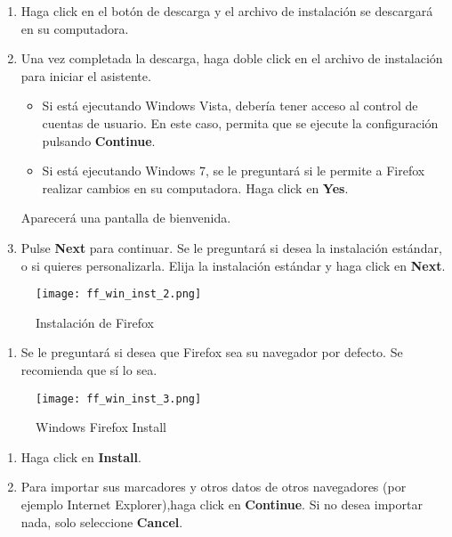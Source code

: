 \documentclass[10pt,a5paper,twoside,,]{book}
\providecommand{\tightlist}{%
  \setlength{\itemsep}{0pt}\setlength{\parskip}{0pt}}
\begin{document}
\begin{enumerate}
\def\labelenumi{\arabic{enumi}.}
\setcounter{enumi}{1}
\item
  Haga click en el botón de descarga y el archivo de instalación se
  descargará en su computadora.
\item
  Una vez completada la descarga, haga doble click en el archivo de
  instalación para iniciar el asistente.

  \begin{itemize}
  \tightlist
  \item
    Si está ejecutando Windows Vista, debería tener acceso al control de
    cuentas de usuario. En este caso, permita que se ejecute la
    configuración pulsando \textbf{Continue}.
  \item
    Si está ejecutando Windows 7, se le preguntará si le permite a
    Firefox realizar cambios en su computadora. Haga click en
    \textbf{Yes}.
  \end{itemize}

  Aparecerá una pantalla de bienvenida.
\item
  Pulse \textbf{Next} para continuar. Se le preguntará si desea la
  instalación estándar, o si quieres personalizarla. Elija la
  instalación estándar y haga click en \textbf{Next}.
\end{enumerate}

\begin{figure}[htbp]
\centering
\texttt{[image: ff\_win\_inst\_2.png]}
\caption{Instalación de Firefox}
\end{figure}

\begin{enumerate}
\def\labelenumi{\arabic{enumi}.}
\setcounter{enumi}{4}
\tightlist
\item
  Se le preguntará si desea que Firefox sea su navegador por defecto. Se
  recomienda que sí lo sea.
\end{enumerate}

\begin{figure}[htbp]
\centering
\texttt{[image: ff\_win\_inst\_3.png]}
\caption{Windows Firefox Install}
\end{figure}

\begin{enumerate}
\def\labelenumi{\arabic{enumi}.}
\setcounter{enumi}{5}
\item
  Haga click en \textbf{Install}.
\item
  Para importar sus marcadores y otros datos de otros navegadores (por
  ejemplo Internet Explorer),haga click en \textbf{Continue}. Si no
  desea importar nada, solo seleccione \textbf{Cancel}.
\end{enumerate}
\end{document}
